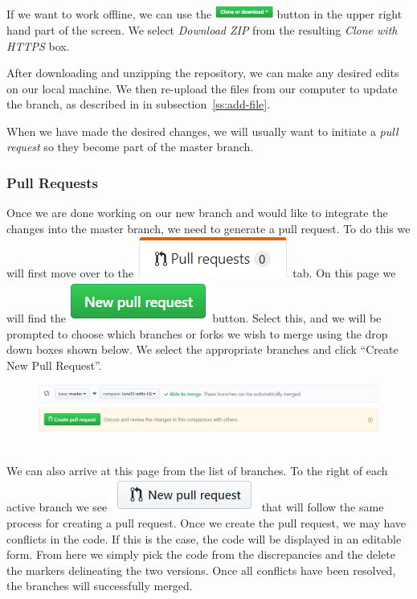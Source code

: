 \documentclass[11pt]{article}
\begin{document}
If we want to work offline, we can use the \includegraphics[width=0.75in]{clone-or-download} button in the upper right hand part of the screen. We select \textit{Download ZIP} from the resulting \textit{Clone with HTTPS} box. 

After downloading and unzipping the repository, we can make any desired edits on our local machine. We then re-upload the files from our computer to update the branch, as described in in subsection~\ref{ss:add-file}. 
 
When we have made the desired changes, we will usually want to initiate a \textit{pull request} so they become part of the master branch. 

\subsubsection{Pull Requests}
Once we are done working on our new branch and would like to integrate the changes into the master branch, we need to generate a pull request. To do this we will first move over to the \includegraphics[scale=.75]{PullReqTab.png} tab. On this page we will find the \includegraphics[scale=.75]{NewPullReq.png} button. Select this, and we will be prompted to choose which branches or forks we wish to merge using the drop down boxes shown below. We select the appropriate branches and click ``Create New Pull Request''.  
\begin{figure}[h!]
\begin{center}
\includegraphics[scale=.5]{CompareBranches.png}
\end{center}
\end{figure} \\
We can also arrive at this page from the list of branches. To the right of each active branch we see \includegraphics[scale=.75]{PullFromBranchList.png} that will follow the same process for creating a pull request. Once we create the pull request, we may have conflicts in the code. If this is the case, the code will be displayed in an editable form. From here we simply pick the code from the discrepancies and the delete the markers delineating the two versions. Once all conflicts have been resolved, the branches will successfully merged.
\end{document}
